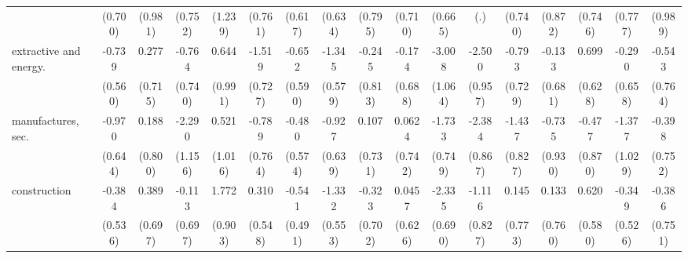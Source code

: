 {\begin{tabular}{l*{16}{c}}
                    &     (0.700)         &     (0.981)         &     (0.752)         &     (1.239)         &     (0.761)         &     (0.617)         &     (0.634)         &     (0.795)         &     (0.710)         &     (0.665)         &         (.)         &     (0.740)         &     (0.872)         &     (0.746)         &     (0.777)         &     (0.989)         \\
[1em]
extractive and energy.&      -0.739         &       0.277         &      -0.764         &       0.644         &      -1.519\sym{*}  &      -0.652         &      -1.345\sym{*}  &      -0.245         &      -0.174         &      -3.008\sym{**} &      -2.500\sym{**} &      -0.793         &      -0.133         &       0.699         &      -0.290         &      -0.543         \\
                    &     (0.560)         &     (0.715)         &     (0.740)         &     (0.991)         &     (0.727)         &     (0.590)         &     (0.579)         &     (0.813)         &     (0.688)         &     (1.064)         &     (0.957)         &     (0.729)         &     (0.681)         &     (0.628)         &     (0.658)         &     (0.764)         \\
[1em]
manufactures, sec.  &      -0.970         &       0.188         &      -2.290\sym{*}  &       0.521         &      -0.789         &      -0.480         &      -0.927         &       0.107         &      0.0624         &      -1.733\sym{*}  &      -2.384\sym{**} &      -1.437         &      -0.735         &      -0.477         &      -1.377         &      -0.398         \\
                    &     (0.644)         &     (0.800)         &     (1.156)         &     (1.016)         &     (0.764)         &     (0.574)         &     (0.639)         &     (0.731)         &     (0.742)         &     (0.749)         &     (0.867)         &     (0.827)         &     (0.930)         &     (0.870)         &     (1.029)         &     (0.752)         \\
[1em]
construction        &      -0.384         &       0.389         &      -0.113         &       1.772\sym{*}  &       0.310         &      -0.541         &      -1.332\sym{*}  &      -0.323         &      0.0457         &      -2.335\sym{***}&      -1.116         &       0.145         &       0.133         &       0.620         &      -0.349         &      -0.386         \\
                    &     (0.536)         &     (0.697)         &     (0.697)         &     (0.903)         &     (0.548)         &     (0.491)         &     (0.553)         &     (0.702)         &     (0.626)         &     (0.690)         &     (0.827)         &     (0.773)         &     (0.760)         &     (0.580)         &     (0.526)         &     (0.751)         \\

\end{tabular}}

